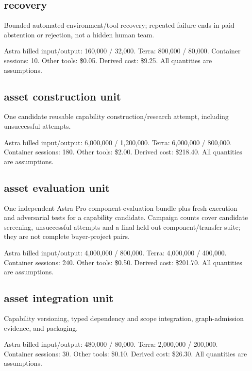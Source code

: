 \documentclass[10pt]{article}
\newcommand{\usd}[1]{\$#1}
\begin{document}
\subsection*{recovery}

Bounded automated environment/tool recovery; repeated failure ends in paid abstention or rejection, not a hidden human team.

Astra billed input/output: 160,000 / 32,000. Terra: 800,000 / 80,000. Container sessions: 10. Other tools: \usd{0.05}. Derived cost: \usd{9.25}. All quantities are assumptions.

\subsection*{asset construction unit}

One candidate reusable capability construction/research attempt, including unsuccessful attempts.

Astra billed input/output: 6,000,000 / 1,200,000. Terra: 6,000,000 / 800,000. Container sessions: 180. Other tools: \usd{2.00}. Derived cost: \usd{218.40}. All quantities are assumptions.

\subsection*{asset evaluation unit}

One independent Astra Pro component-evaluation bundle plus fresh execution and adversarial tests for a capability candidate. Campaign counts cover candidate screening, unsuccessful attempts and a final held-out component/transfer suite; they are not complete buyer-project pairs.

Astra billed input/output: 4,000,000 / 800,000. Terra: 4,000,000 / 400,000. Container sessions: 240. Other tools: \usd{0.50}. Derived cost: \usd{201.70}. All quantities are assumptions.

\subsection*{asset integration unit}

Capability versioning, typed dependency and scope integration, graph-admission evidence, and packaging.

Astra billed input/output: 480,000 / 80,000. Terra: 2,000,000 / 200,000. Container sessions: 30. Other tools: \usd{0.10}. Derived cost: \usd{26.30}. All quantities are assumptions.
\end{document}
